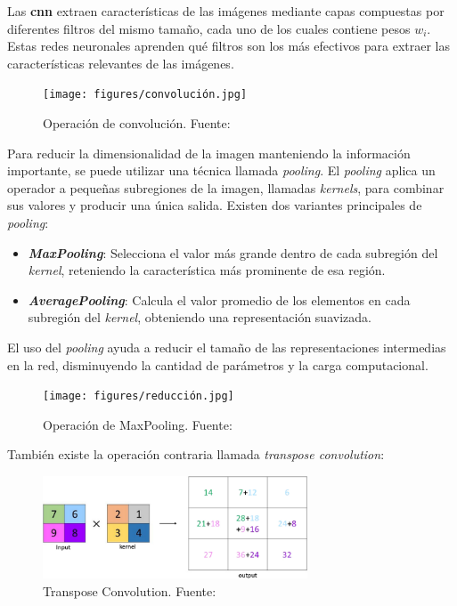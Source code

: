 Las \textbf{\acrlong{cnn}} extraen características de las imágenes mediante capas compuestas por diferentes filtros del mismo tamaño, cada uno de los cuales contiene pesos $w_i$. Estas redes neuronales aprenden qué filtros son los más efectivos para extraer las características relevantes de las imágenes.

\begin{figure}[H]
	\centering
	\texttt{[image: figures/convolución.jpg]}
	\caption{\label{fig:convolucion}Operación de convolución. Fuente: \cite{Calvo}}
\end{figure}

Para reducir la dimensionalidad de la imagen manteniendo la información importante, se puede utilizar una técnica llamada \textit{pooling}. El \textit{pooling} aplica un operador a pequeñas subregiones de la imagen, llamadas \textit{kernels}, para combinar sus valores y producir una única salida\cite{Calvo}. Existen dos variantes principales de \textit{pooling}:
\begin{itemize}
	\item \textbf{\textit{MaxPooling}}: Selecciona el valor más grande dentro de cada subregión del \textit{kernel}, reteniendo la característica más prominente de esa región.
	\item \textbf{\textit{AveragePooling}}: Calcula el valor promedio de los elementos en cada subregión del \textit{kernel}, obteniendo una representación suavizada.
\end{itemize}

El uso del \textit{pooling} ayuda a reducir el tamaño de las representaciones intermedias en la red, disminuyendo la cantidad de parámetros y la carga computacional.

\begin{figure}[H]
	\centering
	\texttt{[image: figures/reducción.jpg]}
	\caption{\label{fig:maxpooling}Operación de MaxPooling. Fuente: \cite{Calvo}}
\end{figure}

También existe la operación contraria llamada \textit{transpose convolution}:

\begin{figure}[H]
	\centering
	\includegraphics[width=0.7\textwidth]{figures/Transpose-Convolution.png}
	\caption{\label{fig:transposecv}Transpose Convolution. Fuente: \cite{transposecv}}
\end{figure}

